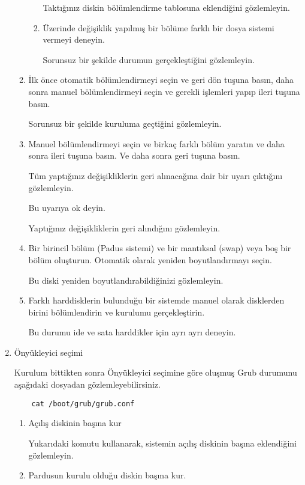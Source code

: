 \documentclass[a4paper,10pt]{article}
\begin{document}
\begin{enumerate}
\begin{enumerate}
\begin{enumerate}
		Taktığınız diskin bölümlendirme tablosuna eklendiğini gözlemleyin.

            \item Üzerinde değişiklik yapılmış bir bölüme farklı bir dosya sistemi vermeyi deneyin.

		Sorunsuz bir şekilde durumun gerçekleştiğini gözlemleyin.
        \end{enumerate}
        \item İlk önce otomatik bölümlendirmeyi seçin ve geri dön tuşuna basın, daha sonra manuel bölümlendirmeyi seçin ve gerekli işlemleri yapıp ileri tuşuna basın.

	Sorunsuz bir şekilde kuruluma geçtiğini gözlemleyin.
	\item Manuel bölümlendirmeyi seçin ve birkaç farklı bölüm yaratın ve daha sonra ileri tuşuna basın. Ve daha sonra geri tuşuna basın.

	Tüm yaptığınız değişikliklerin geri alınacağına dair bir uyarı çıktığını gözlemleyin. 

	Bu uyarıya ok deyin. 
		
	Yaptığınız değişikliklerin geri alındığını gözlemleyin.
	 
    \item Bir birincil bölüm (Padus sistemi) ve bir mantıksal (swap) veya boş bir bölüm oluşturun. Otomatik olarak yeniden boyutlandırmayı seçin.

	Bu diski yeniden boyutlandırabildiğinizi gözlemleyin.
    \item  Farklı harddisklerin bulunduğu bir sistemde manuel olarak disklerden birini bölümlendirin ve kurulumu gerçekleştirin.

            Bu durumu ide ve sata harddikler için ayrı ayrı deneyin.
    \end{enumerate}
\item Önyükleyici seçimi

Kurulum bittikten sonra Önyükleyici seçimine göre oluşmuş Grub durumunu aşağıdaki dosyadan gözlemleyebilirsiniz. 
   \begin{verbatim}
    cat /boot/grub/grub.conf 
   \end{verbatim}


   \begin{enumerate}
     \item Açılış diskinin başına kur

	Yukarıdaki komutu kullanarak, sistemin açılış diskinin başına eklendiğini gözlemleyin.
    \item Pardusun kurulu olduğu diskin başına kur.


\end{enumerate}
\end{enumerate}
\end{document}
